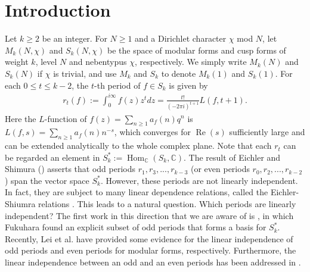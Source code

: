 \documentclass[11pt,letterpaper,reqno]{amsart}
\newcommand\ques[1]{\textcolor{blue}{\textbf{Question}: #1}}
\numberwithin{figure}{section}
\numberwithin{table}{section}
\theoremstyle{definition}
\theoremstyle{plain}
\theoremstyle{definition}
\theoremstyle{definition}
\theoremstyle{remark}
\numberwithin{equation}{section}
\theoremstyle{remark}
\DeclareMathOperator{\Hom}{Hom}
\DeclareMathOperator{\re}{Re}
\begin{document}
\section{Introduction}
Let $k\geq2$ be an integer. For $N\geq1$ and a Dirichlet character $\chi$ mod $N$, let $M_k(N,\chi)$ and $S_k(N,\chi)$ be the space of modular forms and cusp forms of weight $k$, level $N$ and nebentypus $\chi$, respectively. We simply write $M_k(N)$ and $S_k(N)$ if $\chi$ is trivial, and use $M_k$ and $S_k$ to denote $M_k(1)$ and $S_k(1)$. 
For each $0\leq t\leq k-2$, the $t$-th period of $f\in S_k$ is given by
\begin{align}
    r_t(f):=\int_0^{i\infty}f(z)z^tdz=\frac{t!}{(-2\pi i)^{t+1}}L(f,t+1).
\end{align}
Here the $L$-function of $f(z)=\sum_{n\geq1}a_f(n)q^n$ is $L(f,s)=\sum_{n\geq1}a_f(n)n^{-s}$, which converges for $\re(s)$ sufficiently large and can be extended analytically to the whole complex plane. Note that each $r_t$ can be regarded an element in $S_k^{\ast}:=\Hom_{\mathbb{C}}(S_k,\mathbb{C})$. The result of Eichler and Shimura (\cite{Eichlerperiod,Manin1973,Kohnen1984}) asserts that odd periods $r_1,r_3,...,r_{k-3}$ (or even periods $r_0,r_2,...,r_{k-2}$) span the vector space $S_k^{\ast}$. However, these periods are not linearly independent. In fact, they are subject to many linear dependence relations, called the Eichler-Shiumra relations \cite{Manin1973}.
     This leads to a natural question. Which periods are linearly independent? The first work in this direction that we are aware of is \cite{Fukuhara07}, in which Fukuhara found an explicit subset of odd periods that forms a basis for $S_k^{\ast}$. Recently,  Lei et al. \cite{oddperiods,evenperiods} have provided some evidence for the linear independence of odd periods and even periods for modular forms, respectively. Furthermore, the linear independence between an odd and an even periods has been addressed in \cite{Xueoddandevenperiods}.
\end{document}
